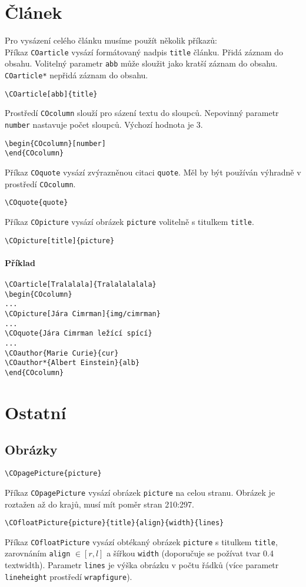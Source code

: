 \documentclass[a4paper]{article}
\begin{document}
\section{Článek}%
\label{article}
Pro vysázení celého článku musíme použít několik příkazů:\\[0.3cm]
Příkaz \texttt{COarticle} vysází formátovaný nadpis \texttt{title} článku. Přidá záznam do obsahu. Volitelný parametr \texttt{abb} může sloužit jako kratší záznam do obsahu. \texttt{COarticle*} nepřidá záznam do obsahu.
\begin{verbatim}
\COarticle[abb]{title}
\end{verbatim}
Prostředí \texttt{COcolumn} slouží pro sázení textu do sloupců. Nepovinný parametr \texttt{number} nastavuje počet sloupců. Výchozí hodnota je $3$.
\begin{verbatim}
\begin{COcolumn}[number]
\end{COcolumn}
\end{verbatim}
Příkaz \texttt{COquote} vysází zvýrazněnou citaci \texttt{quote}. Měl by být používán výhradně v prostředí \texttt{COcolumn}.
\begin{verbatim}
\COquote{quote}
\end{verbatim}
Příkaz \texttt{COpicture} vysází obrázek \texttt{picture} volitelně s titulkem \texttt{title}.
\begin{verbatim}
\COpicture[title]{picture}
\end{verbatim}
\paragraph{Příklad}
\begin{verbatim}
\COarticle[Tralalala]{Tralalalalala}
\begin{COcolumn}
...
\COpicture[Jára Cimrman]{img/cimrman}
...
\COquote{Jára Cimrman ležící spící}
...
\COauthor{Marie Curie}{cur}
\COauthor*{Albert Einstein}{alb}
\end{COcolumn}
\end{verbatim}
%
\section{Ostatní}%
\subsection{Obrázky}
\begin{verbatim}
\COpagePicture{picture}
\end{verbatim}
Příkaz \texttt{COpagePicture} vysází obrázek \texttt{picture} na celou stranu. Obrázek je roztažen až do krajů, musí mít poměr stran 210:297.
\begin{verbatim}
\COfloatPicture{picture}{title}{align}{width}{lines}
\end{verbatim}
Příkaz \texttt{COfloatPicture} vysází obtékaný obrázek \texttt{picture} s titulkem \texttt{title}, zarovnáním \texttt{align} $ \in \left[r,l\right] $ a šířkou \texttt{width} (doporučuje se požívat tvar 0.4\\textwidth). Parametr \texttt{lines} je výška obrázku v počtu řádků (více parametr \texttt{lineheight} prostředí \texttt{wrapfigure}).
%
\end{document}
